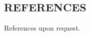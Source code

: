 \documentclass[margin, 10pt]{res} %
\begin{document}
\begin{resume}


\section{REFERENCES} 

References upon request.

\end{resume}
\end{document}
